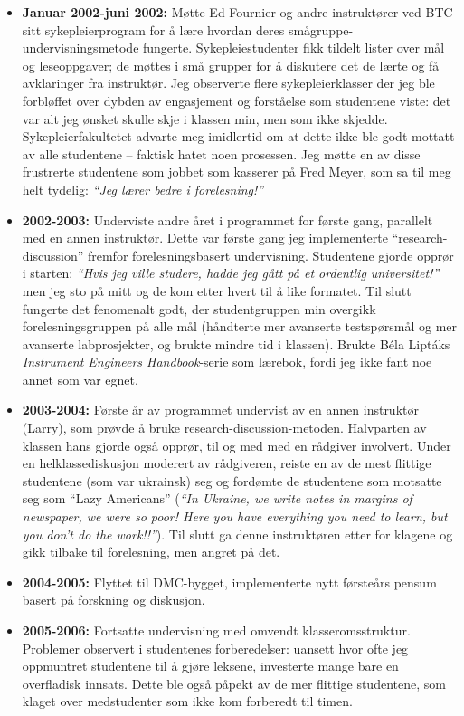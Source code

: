 \begin{itemize}
\vskip 10pt
\item{} {\bf Januar 2002-juni 2002:} Møtte Ed Fournier og andre instruktører ved BTC sitt sykepleierprogram for å lære hvordan deres smågruppe-undervisningsmetode fungerte.  Sykepleiestudenter fikk tildelt lister over mål og leseoppgaver; de møttes i små grupper for å diskutere det de lærte og få avklaringer fra instruktør.  Jeg observerte flere sykepleierklasser der jeg ble forbløffet over dybden av engasjement og forståelse som studentene viste: det var alt jeg ønsket skulle skje i klassen min, men som ikke skjedde.  Sykepleierfakultetet advarte meg imidlertid om at dette ikke ble godt mottatt av alle studentene -- faktisk hatet noen prosessen.  Jeg møtte en av disse frustrerte studentene som jobbet som kasserer på Fred Meyer, som sa til meg helt tydelig: {\it ``Jeg lærer bedre i forelesning!''}
\vskip 10pt
\item{} {\bf 2002-2003:} Underviste andre året i programmet for første gang, parallelt med en annen instruktør.  Dette var første gang jeg implementerte ``research-discussion'' fremfor forelesningsbasert undervisning.  Studentene gjorde opprør i starten: {\it ``Hvis jeg ville studere, hadde jeg gått på et ordentlig universitet!''} men jeg sto på mitt og de kom etter hvert til å like formatet.  Til slutt fungerte det fenomenalt godt, der studentgruppen min overgikk forelesningsgruppen på alle mål (håndterte mer avanserte testspørsmål og mer avanserte labprosjekter, og brukte mindre tid i klassen).  Brukte B\'ela Lipt\'aks {\it Instrument Engineers Handbook}-serie som lærebok, fordi jeg ikke fant noe annet som var egnet.
\vskip 10pt
\item{} {\bf 2003-2004:} Første år av programmet undervist av en annen instruktør (Larry), som prøvde å bruke research-discussion-metoden.  Halvparten av klassen hans gjorde også opprør, til og med med en rådgiver involvert.  Under en helklassediskusjon moderert av rådgiveren, reiste en av de mest flittige studentene (som var ukrainsk) seg og fordømte de studentene som motsatte seg som ``Lazy Americans'' ({\it ``In Ukraine, we write notes in margins of newspaper, we were so poor!  Here you have everything you need to learn, but you don't do the work!!''}).  Til slutt ga denne instruktøren etter for klagene og gikk tilbake til forelesning, men angret på det.
\vskip 10pt
\item{} {\bf 2004-2005:} Flyttet til DMC-bygget, implementerte nytt førsteårs pensum basert på forskning og diskusjon.
\vskip 10pt
\item{} {\bf 2005-2006:} Fortsatte undervisning med omvendt klasseromsstruktur.  Problemer observert i studentenes forberedelser: uansett hvor ofte jeg oppmuntret studentene til å gjøre leksene, investerte mange bare en overfladisk innsats.  Dette ble også påpekt av de mer flittige studentene, som klaget over medstudenter som ikke kom forberedt til timen.

\end{itemize}
